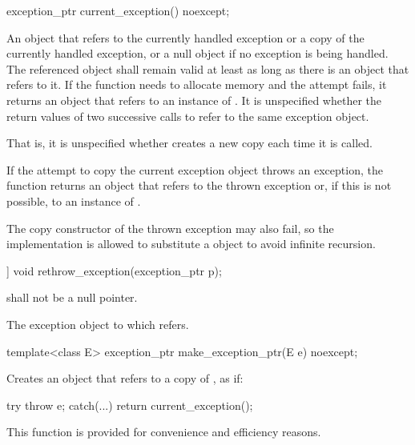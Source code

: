 %
\begin{itemdecl}
exception_ptr current_exception() noexcept;
\end{itemdecl}

\begin{itemdescr}
\pnum
\returns An  object that refers to
the currently handled exception or a copy of the currently
handled exception, or a null  object if no exception is being
handled. The referenced object shall remain valid at least as long as there is an
 object that refers to it.
If the function needs to allocate memory and the attempt fails, it returns an
 object that refers to an instance of .
It is unspecified whether the return values of two successive calls to
 refer to the same exception object.
\begin{note} That is, it is unspecified whether 
creates a new copy each time it is called. \end{note}
If the attempt to copy the current exception object throws an exception, the function
returns an  object that refers to the thrown exception or,
if this is not possible, to an instance of . \begin{note} The
copy constructor of the thrown exception may also fail, so the implementation is allowed
to substitute a  object to avoid infinite
recursion.\end{note}
\end{itemdescr}

%
\begin{itemdecl}
[[noreturn]] void rethrow_exception(exception_ptr p);
\end{itemdecl}

\begin{itemdescr}
\pnum
\requires {} shall not be a null pointer.

\pnum
\throws The exception object to which  refers.
\end{itemdescr}

%
\begin{itemdecl}
template<class E> exception_ptr make_exception_ptr(E e) noexcept;
\end{itemdecl}

\begin{itemdescr}
\pnum
\effects Creates an  object that refers to a copy of , as if:
\begin{codeblock}
try {
  throw e;
} catch(...) {
  return current_exception();
}
\end{codeblock}

\pnum
\begin{note} This function is provided for convenience and
efficiency reasons. \end{note}
\end{itemdescr}

